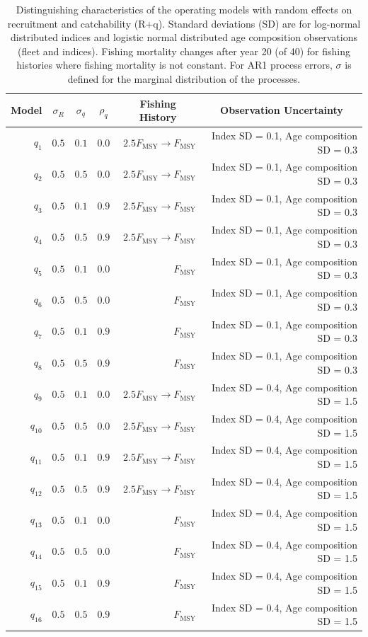 \documentclass[
  12pt,
]{article}
\begin{document}
\begin{landscape}
\begin{table}
\caption{Distinguishing characteristics of the operating models with random effects on recruitment and catchability (R+q). Standard deviations (SD) are for log-normal distributed indices and logistic normal distributed age composition observations (fleet and indices). Fishing mortality changes after year 20 (of 40) for fishing histories where fishing mortality is not constant. For AR1 process errors, $\sigma$ is defined for the marginal distribution of the processes.}\label{q_om_table}
{\begin{center}
\begin{tabular}{rrrrrr}
\hline\hline
\multicolumn{1}{c}{Model}&\multicolumn{1}{c}{$\sigma_R$}&\multicolumn{1}{c}{$\sigma_{q}$}&\multicolumn{1}{c}{$\rho_{q}$}&\multicolumn{1}{c}{Fishing History}&\multicolumn{1}{c}{Observation Uncertainty}\tabularnewline
\hline
$q_{1}$&$0.5$&$0.1$&$0.0$&$2.5 F_{\text{MSY}} \rightarrow F_{\text{MSY}}$&Index SD = 0.1, Age composition SD = 0.3\tabularnewline
$q_{2}$&$0.5$&$0.5$&$0.0$&$2.5 F_{\text{MSY}} \rightarrow F_{\text{MSY}}$&Index SD = 0.1, Age composition SD = 0.3\tabularnewline
$q_{3}$&$0.5$&$0.1$&$0.9$&$2.5 F_{\text{MSY}} \rightarrow F_{\text{MSY}}$&Index SD = 0.1, Age composition SD = 0.3\tabularnewline
$q_{4}$&$0.5$&$0.5$&$0.9$&$2.5 F_{\text{MSY}} \rightarrow F_{\text{MSY}}$&Index SD = 0.1, Age composition SD = 0.3\tabularnewline
$q_{5}$&$0.5$&$0.1$&$0.0$&$F_{\text{MSY}}$&Index SD = 0.1, Age composition SD = 0.3\tabularnewline
$q_{6}$&$0.5$&$0.5$&$0.0$&$F_{\text{MSY}}$&Index SD = 0.1, Age composition SD = 0.3\tabularnewline
$q_{7}$&$0.5$&$0.1$&$0.9$&$F_{\text{MSY}}$&Index SD = 0.1, Age composition SD = 0.3\tabularnewline
$q_{8}$&$0.5$&$0.5$&$0.9$&$F_{\text{MSY}}$&Index SD = 0.1, Age composition SD = 0.3\tabularnewline
$q_{9}$&$0.5$&$0.1$&$0.0$&$2.5 F_{\text{MSY}} \rightarrow F_{\text{MSY}}$&Index SD = 0.4, Age composition SD = 1.5\tabularnewline
$q_{10}$&$0.5$&$0.5$&$0.0$&$2.5 F_{\text{MSY}} \rightarrow F_{\text{MSY}}$&Index SD = 0.4, Age composition SD = 1.5\tabularnewline
$q_{11}$&$0.5$&$0.1$&$0.9$&$2.5 F_{\text{MSY}} \rightarrow F_{\text{MSY}}$&Index SD = 0.4, Age composition SD = 1.5\tabularnewline
$q_{12}$&$0.5$&$0.5$&$0.9$&$2.5 F_{\text{MSY}} \rightarrow F_{\text{MSY}}$&Index SD = 0.4, Age composition SD = 1.5\tabularnewline
$q_{13}$&$0.5$&$0.1$&$0.0$&$F_{\text{MSY}}$&Index SD = 0.4, Age composition SD = 1.5\tabularnewline
$q_{14}$&$0.5$&$0.5$&$0.0$&$F_{\text{MSY}}$&Index SD = 0.4, Age composition SD = 1.5\tabularnewline
$q_{15}$&$0.5$&$0.1$&$0.9$&$F_{\text{MSY}}$&Index SD = 0.4, Age composition SD = 1.5\tabularnewline
$q_{16}$&$0.5$&$0.5$&$0.9$&$F_{\text{MSY}}$&Index SD = 0.4, Age composition SD = 1.5\tabularnewline
\hline
\end{tabular}\end{center}
}
\end{table}
\end{landscape}
\end{document}
